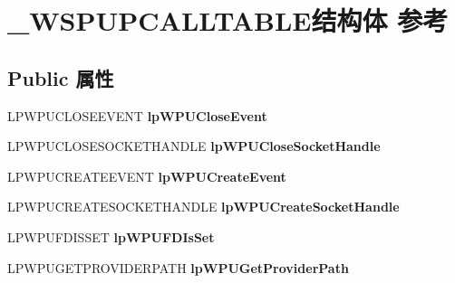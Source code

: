 \hypertarget{struct___w_s_p_u_p_c_a_l_l_t_a_b_l_e}{}\section{\+\_\+\+W\+S\+P\+U\+P\+C\+A\+L\+L\+T\+A\+B\+L\+E结构体 参考}
\label{struct___w_s_p_u_p_c_a_l_l_t_a_b_l_e}
\subsection*{Public 属性}
\begin{DoxyCompactItemize}
\item 
\mbox{\label{struct___w_s_p_u_p_c_a_l_l_t_a_b_l_e_abd746bfc1d596d635fb284ec27e57f0a}} 
L\+P\+W\+P\+U\+C\+L\+O\+S\+E\+E\+V\+E\+NT {\bfseries lp\+W\+P\+U\+Close\+Event}
\item 
\mbox{\label{struct___w_s_p_u_p_c_a_l_l_t_a_b_l_e_afe0d1fa49a44098ef6ef960ce50c4b80}} 
L\+P\+W\+P\+U\+C\+L\+O\+S\+E\+S\+O\+C\+K\+E\+T\+H\+A\+N\+D\+LE {\bfseries lp\+W\+P\+U\+Close\+Socket\+Handle}
\item 
\mbox{\label{struct___w_s_p_u_p_c_a_l_l_t_a_b_l_e_a1ec9a078f53497851bff6ed9a5e438ed}} 
L\+P\+W\+P\+U\+C\+R\+E\+A\+T\+E\+E\+V\+E\+NT {\bfseries lp\+W\+P\+U\+Create\+Event}
\item 
\mbox{\label{struct___w_s_p_u_p_c_a_l_l_t_a_b_l_e_a2a12f244471890d52ffbed0ad7db8b66}} 
L\+P\+W\+P\+U\+C\+R\+E\+A\+T\+E\+S\+O\+C\+K\+E\+T\+H\+A\+N\+D\+LE {\bfseries lp\+W\+P\+U\+Create\+Socket\+Handle}
\item 
\mbox{\label{struct___w_s_p_u_p_c_a_l_l_t_a_b_l_e_aedadec218d75f266e361e2ed53700def}} 
L\+P\+W\+P\+U\+F\+D\+I\+S\+S\+ET {\bfseries lp\+W\+P\+U\+F\+D\+Is\+Set}
\item 
\mbox{\label{struct___w_s_p_u_p_c_a_l_l_t_a_b_l_e_aee13590e8073eae313bd3eddce01d37c}} 
L\+P\+W\+P\+U\+G\+E\+T\+P\+R\+O\+V\+I\+D\+E\+R\+P\+A\+TH {\bfseries lp\+W\+P\+U\+Get\+Provider\+Path}
\item 

\end{DoxyCompactItemize}
